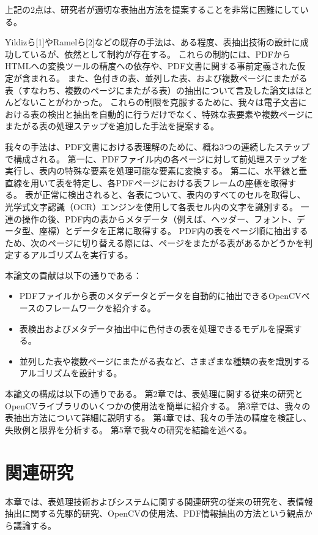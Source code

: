 \documentclass[uplatex, twocolumn,10pt]{jsarticle}
\begin{document}
上記の2点は、研究者が適切な表抽出方法を提案することを非常に困難にしている。

Yildizら[1]やRamelら[2]などの既存の手法は、ある程度、表抽出技術の設計に成功しているが、依然として制約が存在する。
これらの制約には、PDFからHTMLへの変換ツールの精度への依存や、PDF文書に関する事前定義された仮定が含まれる。
また、色付きの表、並列した表、および複数ページにまたがる表（すなわち、複数のページにまたがる表）の抽出について言及した論文はほとんどないことがわかった。
これらの制限を克服するために、我々は電子文書における表の検出と抽出を自動的に行うだけでなく、特殊な表要素や複数ページにまたがる表の処理ステップを追加した手法を提案する。

我々の手法は、PDF文書における表理解のために、概ね3つの連続したステップで構成される。
第一に、PDFファイル内の各ページに対して前処理ステップを実行し、表内の特殊な要素を処理可能な要素に変換する。
第二に、水平線と垂直線を用いて表を特定し、各PDFページにおける表フレームの座標を取得する。
表が正常に検出されると、各表について、表内のすべてのセルを取得し、光学式文字認識（OCR）エンジンを使用して各表セル内の文字を識別する。
一連の操作の後、PDF内の表からメタデータ（例えば、ヘッダー、フォント、データ型、座標）とデータを正常に取得する。
PDF内の表をページ順に抽出するため、次のページに切り替える際には、ページをまたがる表があるかどうかを判定するアルゴリズムを実行する。

本論文の貢献は以下の通りである：
\begin{itemize}
    \item PDFファイルから表のメタデータとデータを自動的に抽出できるOpenCVベースのフレームワークを紹介する。
    \item 表検出およびメタデータ抽出中に色付きの表を処理できるモデルを提案する。
    \item 並列した表や複数ページにまたがる表など、さまざまな種類の表を識別するアルゴリズムを設計する。
\end{itemize}

本論文の構成は以下の通りである。
第2章では、表処理に関する従来の研究とOpenCVライブラリのいくつかの使用法を簡単に紹介する。
第3章では、我々の表抽出方法について詳細に説明する。
第4章では、我々の手法の精度を検証し、失敗例と限界を分析する。
第5章で我々の研究を結論を述べる。


\section{関連研究}

本章では、表処理技術およびシステムに関する関連研究の従来の研究を、表情報抽出に関する先駆的研究、OpenCVの使用法、PDF情報抽出の方法という観点から議論する。
\end{document}
